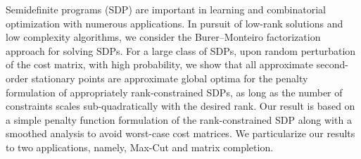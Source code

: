 Semidefinite programs (SDP) are important in learning and combinatorial optimization with numerous applications. In pursuit of low-rank solutions and low complexity algorithms, we consider the Burer--Monteiro factorization approach for solving SDPs. For a large class of SDPs, upon random perturbation of the cost matrix, with high probability, we show that all approximate second-order stationary points are approximate global optima for the penalty formulation of appropriately rank-constrained SDPs, as long as the number of constraints scales sub-quadratically with the desired rank. Our result is based on a simple penalty function formulation of the rank-constrained SDP along with a smoothed analysis to avoid worst-case cost matrices. We particularize our results to two applications, namely, Max-Cut and matrix completion. 




